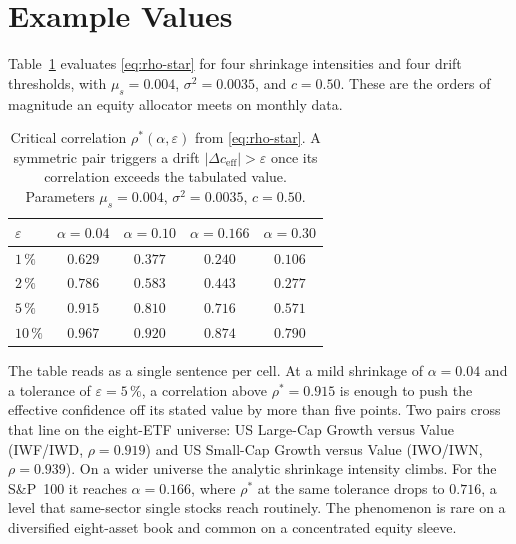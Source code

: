 \documentclass[a4paper,11pt]{article}
\theoremstyle{plain}
\theoremstyle{definition}
\newcommand{\eff}{\mathrm{eff}}
\begin{document}
\section{Example Values}
\label{sec:values}

Table~\ref{tab:rho-star} evaluates \eqref{eq:rho-star} for four shrinkage
intensities and four drift thresholds, with $\mu_s = 0.004$, $\sigma^2 = 0.0035$,
and $c = 0.50$. These are the orders of magnitude an equity allocator meets on
monthly data.

\begin{table}[H]
\centering
\caption{Critical correlation $\rho^*(\alpha, \varepsilon)$ from
\eqref{eq:rho-star}. A symmetric pair triggers a drift $|\Delta c_{\eff}| > \varepsilon$
once its correlation exceeds the tabulated value. Parameters
$\mu_s = 0.004$, $\sigma^2 = 0.0035$, $c = 0.50$.}
\label{tab:rho-star}
\begin{tabular}{lcccc}
\toprule
$\varepsilon$ & $\alpha = 0.04$ & $\alpha = 0.10$ & $\alpha = 0.166$ & $\alpha = 0.30$ \\
\midrule
$1\,\%$  & $0.629$ & $0.377$ & $0.240$ & $0.106$ \\
$2\,\%$  & $0.786$ & $0.583$ & $0.443$ & $0.277$ \\
$5\,\%$  & $0.915$ & $0.810$ & $0.716$ & $0.571$ \\
$10\,\%$ & $0.967$ & $0.920$ & $0.874$ & $0.790$ \\
\bottomrule
\end{tabular}
\end{table}

The table reads as a single sentence per cell. At a mild shrinkage of
$\alpha = 0.04$ and a tolerance of $\varepsilon = 5\,\%$, a correlation above
$\rho^* = 0.915$ is enough to push the effective confidence off its stated value
by more than five points. Two pairs cross that line on the eight-ETF universe:
US Large-Cap Growth versus Value (IWF/IWD, $\rho = 0.919$) and US Small-Cap
Growth versus Value (IWO/IWN, $\rho = 0.939$). On a wider universe the analytic
shrinkage intensity climbs. For the S\&P~100 it reaches $\alpha = 0.166$, where
$\rho^*$ at the same tolerance drops to $0.716$, a level that same-sector single
stocks reach routinely. The phenomenon is rare on a diversified eight-asset book
and common on a concentrated equity sleeve.

\end{document}
